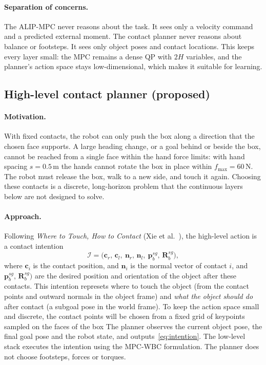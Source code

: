 \documentclass[11pt]{article}
\theoremstyle{remark}
\theoremstyle{definition}
\newcommand{\p}{\bm{p}}
\newcommand{\n}{\bm{n}}
\newcommand{\cc}{\bm{c}}
\newcommand{\Rot}{\bm{R}}
\begin{document}
\paragraph{Separation of concerns.} The ALIP-MPC never reasons about the task. It sees only a velocity command and
a predicted external moment. The contact planner never reasons about balance or footsteps. It sees only object poses
and contact locations. This keeps every layer small: the MPC remains a dense QP with $2H$ variables, and the planner's
action space stays low-dimensional, which makes it suitable for learning.

\subsection{High-level contact planner (proposed)}\label{sec:hlplanner}
\paragraph{Motivation.} With fixed contacts, the robot can only push the box along a direction that the chosen face
supports. A large heading change, or a goal behind or beside the box, cannot be reached from a single face within the
hand force limits: with hand spacing $s=0.5\,$m the hands cannot rotate the box in place within $f_{\max}=60\,$N. The robot must release the box, walk to a new
side, and touch it again. Choosing these contacts is a discrete, long-horizon problem that the continuous layers below
are not designed to solve.

\paragraph{Approach.} Following \emph{Where to Touch, How to Contact} (Xie et al.~\cite{xie}), the high-level action
is a contact intention
\begin{equation}
  \mathcal I=\big(\cc_r,\,\cc_l,\ \n_r,\,\n_l,\ \p_b^{sg},\,\Rot_b^{sg}\big),
  \label{eq:intention}
\end{equation}
where $\cc_i$ is the contact position, and $\n_i$ is the normal vector of contact $i$, and $\p_b^{sg},\,\Rot_b^{sg}\big)$ are the desired position and orientation of the object after these contacts. 
This intention represets where to touch the object (from the contact points and outward normals in the object frame) and \emph{what the
object should do} after contact (a subgoal pose in the world frame). To keep the action space small and discrete, the
contact points will be chosen from a fixed grid of keypoints sampled on the faces of the box
The planner observes the current object pose, the final goal pose and the robot state, and outputs~\eqref{eq:intention}.
The low-level stack executes the intention using the MPC-WBC formulation. The planner does not choose footsteps, forces or torques.
\end{document}

